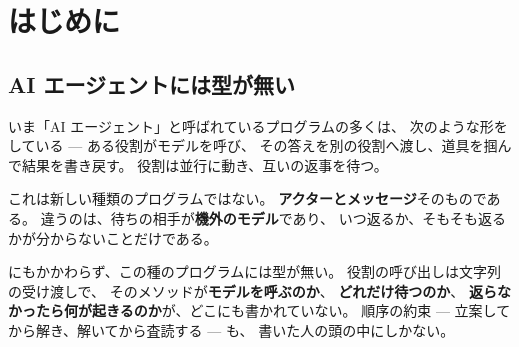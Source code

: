 \documentclass[11pt,a4paper]{ltjsarticle}
\theoremstyle{definition}
\theoremstyle{remark}
\begin{document}
\begin{abstract}
\textbf{デッドロック}については、AIPL で待ちが返らなくなる経路が\textbf{四つ}あり、
一つのものとして扱うと答えを誤ることを示す ---
循環待ち、返信されない待ち、\texttt{select} が来ないメッセージを待つ場合、
そして資源を逆順に取る場合である。
四つとも型で押さえた結果、\textbf{待ちの宛先がクラスとして分かるか、
宛先ノードのレベルが宣言されている範囲では、デッドロック自由が型で保証される}。
成立の条件と、依然として残る範囲を明記する。

三役（立案・求解・査読）の AI エージェントを題材に、
型が何を止めるかを実測で示す --- 期限を外すと警告が出て後続の型が合わなくなり、
\texttt{ai} 効果を隠すと弾かれ、役割の順序を入れ替えるとセッション型が弾き、
失敗を確かめずに次へ渡すと型が合わない。
最新仕様の代表的なサンプル 20 本を、コード・出力・メリット・デメリットとともに解説し、
そのうち 18 本が\textbf{三つの独立な処理系で出力一致}することを確認した。
弾かれるべきプログラムは 31 本ある。
なお本稿が仕様として述べるのは、三実装すべてが備える\textbf{核}である ---
Python 版はこれに記録型・精緻化型・チャネル・所有などの\textbf{拡張}を持っており、
言語は二層になっている（\S\ref{sec:layers}）。
\textbf{デッドロック自由と効果の健全性}については\textbf{機械検証}まで進めた ---
Coq/Rocq で、\texttt{await} を含んだままの言語について
公理なしで証明してある（\S\ref{sec:coq}）。
\end{abstract}

\tableofcontents
\newpage

\section{はじめに}
\label{sec:intro}

\subsection{AI エージェントには型が無い}

いま「AI エージェント」と呼ばれているプログラムの多くは、
次のような形をしている --- ある役割がモデルを呼び、
その答えを別の役割へ渡し、道具を掴んで結果を書き戻す。
役割は並行に動き、互いの返事を待つ。

これは新しい種類のプログラムではない。
\textbf{アクターとメッセージ}そのものである。
違うのは、待ちの相手が\textbf{機外のモデル}であり、
いつ返るか、そもそも返るかが分からないことだけである。

にもかかわらず、この種のプログラムには型が無い。
役割の呼び出しは文字列の受け渡しで、
そのメソッドが\textbf{モデルを呼ぶのか}、
\textbf{どれだけ待つのか}、
\textbf{返らなかったら何が起きるのか}が、どこにも書かれていない。
順序の約束 --- 立案してから解き、解いてから査読する --- も、
書いた人の頭の中にしかない。
\end{document}
